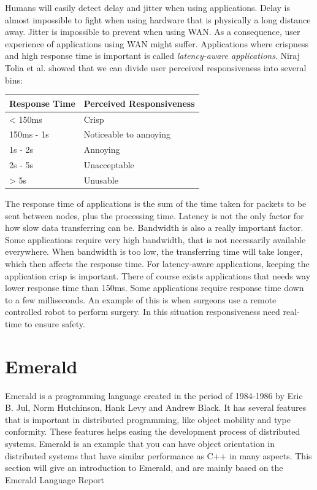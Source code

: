 Humans will easily detect delay and jitter when using applications\cite{satyanarayanan_case_2009}. Delay is almost impossible to fight when using hardware that is physically a long distance away. Jitter is impossible to prevent when using WAN. As a consequence, user experience of applications using WAN might suffer. Applications where crispness and high response time is important is called \textit{latency-aware applications}. Niraj Tolia et al.\cite{tolia_quantifying_2006} showed that we can divide user perceived responsiveness into several bins:
\begin{center}
\begin{tabular}{ | p{3cm} | p{5cm} | } 
    \hline
    Response Time& Perceived Responsiveness  \\ 
    \hline
    < 150ms & Crisp  \\ 
    150ms - 1s & Noticeable to annoying \\ 
    1s - 2s & Annoying \\ 
    2s - 5s & Unacceptable \\ 
    > 5s & Unusable \\ 
    \hline
\end{tabular}
\end{center}
The response time of applications is the sum of the time taken for packets to be sent between nodes, plus the processing time. Latency is not the only factor for how slow data transferring can be. Bandwidth is also a really important factor\cite{cerqueira_interactive_2007}. Some applications require very high bandwidth, that is not necessarily available everywhere. When bandwidth is too low, the transferring time will take longer, which then affects the response time. 
For latency-aware applications, keeping the application crisp is important. There of course exists applications that needs way lower response time than 150ms. Some applications require response time down to a few milliseconds. An example of this is when surgeons use a remote controlled robot to perform surgery. In this situation responsiveness need real-time to ensure safety. 








\section{Emerald}\label{Emerald}
Emerald is a programming language created in the period of 1984-1986 by Eric B. Jul, Norm Hutchinson, Hank Levy and Andrew Black. It has several features that is important in distributed programming, like object mobility and type conformity. These features helps easing the development process of distributed systems. Emerald is an example that you can have object orientation in distributed systems that have similar performance as C++ in many aspects. This section will give an introduction to Emerald, and are mainly based on the Emerald Language Report\cite{hutchinson_emerald_nodate}

